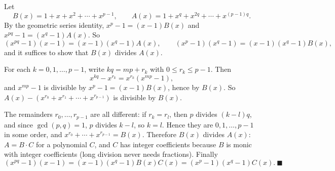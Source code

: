Let
\[B(x)=1+x+x^2+\cdots+x^{p-1},\qquad A(x)=1+x^q+x^{2q}+\cdots+x^{(p-1)q}.\]
By the geometric series identity, $x^p-1=(x-1)B(x)$ and $x^{pq}-1=\left(x^q-1\right)A(x)$. So
\[\left(x^{pq}-1\right)(x-1)=(x-1)\left(x^q-1\right)A(x),\qquad\left(x^p-1\right)\left(x^q-1\right)=(x-1)\left(x^q-1\right)B(x),\]
and it suffices to show that $B(x)$ divides $A(x)$.

For each $k=0,1,\dots,p-1$, write $kq=mp+r_k$ with $0\le r_k\le p-1$. Then
\[x^{kq}-x^{r_k}=x^{r_k}\left(x^{mp}-1\right),\]
and $x^{mp}-1$ is divisible by $x^p-1=(x-1)B(x)$, hence by $B(x)$. So $A(x)-\left(x^{r_0}+x^{r_1}+\cdots+x^{r_{p-1}}\right)$ is divisible by $B(x)$.

The remainders $r_0,\dots,r_{p-1}$ are all different: if $r_k=r_l$, then $p$ divides $(k-l)q$, and since $\gcd(p,q)=1$, $p$ divides $k-l$, so $k=l$. Hence they are $0,1,\dots,p-1$ in some order, and $x^{r_0}+\cdots+x^{r_{p-1}}=B(x)$. Therefore $B(x)$ divides $A(x)$: $A=B\cdot C$ for a polynomial $C$, and $C$ has integer coefficients because $B$ is monic with integer coefficients (long division never needs fractions). Finally
\[\left(x^{pq}-1\right)(x-1)=(x-1)\left(x^q-1\right)B(x)C(x)=\left(x^p-1\right)\left(x^q-1\right)C(x).\ \blacksquare\]
